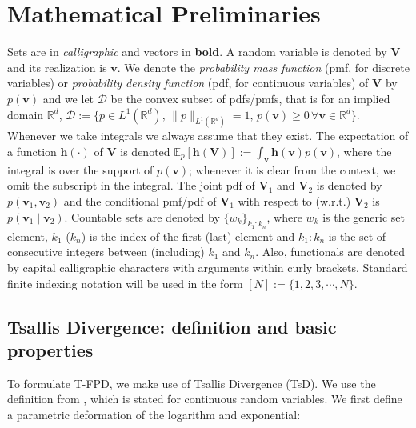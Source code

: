 \documentclass[a4paper,fleqn]{cas-sc}
\newcommand{\todoinb}[1]{\todo[inline,color=blue!20, linecolor=orange!250]{\small#1}}
\newcommand{\grtodo}[1]{\todoinb{\textbf{From GR:} #1}}
\newcommand{\R}{\mathbb{R}}
\newcommand{\E}{\mathbb{E}}
\newcommand{\bv}[1]{\mathbf{#1}}
\newcommand{\sD}{\mathcal{D}}
\newcommand{\TsD}{TsD}
\begin{document}
\section{Mathematical Preliminaries}\label{sec:prelim}
Sets are in {\em calligraphic} and vectors in {\bf bold}.   A random variable is denoted by $\bv{V}$ and its realization is $\bv{v}$. We denote the \textit{probability mass function} (pmf, for discrete variables) or \textit{probability density function} (pdf, for continuous variables) of $\bv{V}$  by $p(\bv{v})$ and we let $\sD$ be the convex subset of pdfs/pmfs, that is for an implied domain $\R^d$, $\sD:=\{p\in L^1(\R^d),\,\|p\|_{L^1(\R^d)}=1,\, p(\bv{v})\ge 0 \,\forall \bv{v}\in\R^d\}$. Whenever we take  integrals we always assume that they exist.  The  expectation of a function $\bv{h}(\cdot)$ of $\bv{V}$ is denoted $\E_{{p}}[\mathbf{h}(\bv{V})]:=\int_{\bv{v}}\bv{h}(\bv{v})p(\mathbf{v})$, where the integral is over the support of $p(\bv{v})$; whenever it is clear from the context, we  omit the subscript in the integral.
The {joint} pdf of $\bv{V}_1$ and $\bv{V}_2$ is denoted by  $p(\bv{v}_1,\bv{v}_2)$ and the {conditional} pmf/pdf of $\bv{V}_1$ with respect to (w.r.t.) $\bv{V}_2$ is $p\left( \bv{v}_1\mid   \bv{v}_2 \right)$. Countable sets are denoted by $\lbrace w_k \rbrace_{k_1:k_n}$, where $w_k$ is the generic set element, $k_1$ ($k_n$) is the index of the first (last) element and  $k_1:k_n$ is the set of consecutive integers between (including) $k_1$ and $k_n$.
Also,  functionals are denoted by capital calligraphic characters with arguments within curly brackets. Standard finite indexing notation will be used in the form $[N]:=\{1,2,3,\cdots,N\}$.  


\subsection{Tsallis Divergence: definition and basic properties}


To formulate T-FPD, we make use of Tsallis Divergence (\TsD). We use the definition from \cite{wang2021variational}, which is stated for continuous random variables. We first define a parametric deformation of the logarithm and exponential:
\end{document}
